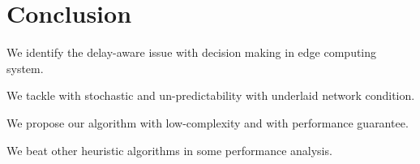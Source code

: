 \section{Conclusion}
We identify the delay-aware issue with decision making in edge computing system.

We tackle with stochastic and un-predictability with underlaid network condition.

We propose our algorithm with low-complexity and with performance guarantee.

We beat other heuristic algorithms in some performance analysis.
